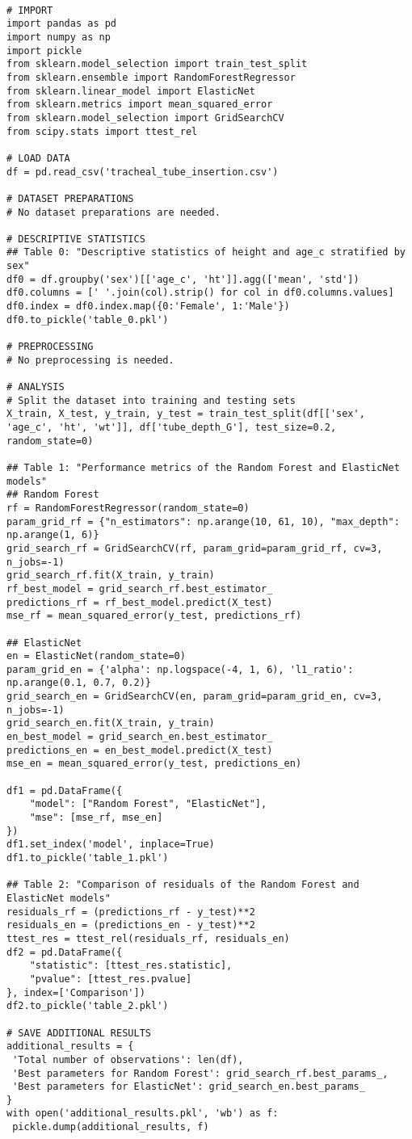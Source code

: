 \documentclass[11pt]{article}
\begin{document}
\begin{verbatim}

# IMPORT
import pandas as pd
import numpy as np
import pickle
from sklearn.model_selection import train_test_split
from sklearn.ensemble import RandomForestRegressor
from sklearn.linear_model import ElasticNet
from sklearn.metrics import mean_squared_error
from sklearn.model_selection import GridSearchCV
from scipy.stats import ttest_rel

# LOAD DATA
df = pd.read_csv('tracheal_tube_insertion.csv')

# DATASET PREPARATIONS
# No dataset preparations are needed.

# DESCRIPTIVE STATISTICS
## Table 0: "Descriptive statistics of height and age_c stratified by sex"
df0 = df.groupby('sex')[['age_c', 'ht']].agg(['mean', 'std'])
df0.columns = [' '.join(col).strip() for col in df0.columns.values]
df0.index = df0.index.map({0:'Female', 1:'Male'})
df0.to_pickle('table_0.pkl')

# PREPROCESSING
# No preprocessing is needed.

# ANALYSIS
# Split the dataset into training and testing sets
X_train, X_test, y_train, y_test = train_test_split(df[['sex', 'age_c', 'ht', 'wt']], df['tube_depth_G'], test_size=0.2, random_state=0)

## Table 1: "Performance metrics of the Random Forest and ElasticNet models"
## Random Forest
rf = RandomForestRegressor(random_state=0)
param_grid_rf = {"n_estimators": np.arange(10, 61, 10), "max_depth": np.arange(1, 6)}
grid_search_rf = GridSearchCV(rf, param_grid=param_grid_rf, cv=3, n_jobs=-1)
grid_search_rf.fit(X_train, y_train)
rf_best_model = grid_search_rf.best_estimator_
predictions_rf = rf_best_model.predict(X_test)
mse_rf = mean_squared_error(y_test, predictions_rf)

## ElasticNet
en = ElasticNet(random_state=0)
param_grid_en = {'alpha': np.logspace(-4, 1, 6), 'l1_ratio': np.arange(0.1, 0.7, 0.2)}
grid_search_en = GridSearchCV(en, param_grid=param_grid_en, cv=3, n_jobs=-1)
grid_search_en.fit(X_train, y_train)
en_best_model = grid_search_en.best_estimator_
predictions_en = en_best_model.predict(X_test)
mse_en = mean_squared_error(y_test, predictions_en)

df1 = pd.DataFrame({
    "model": ["Random Forest", "ElasticNet"],
    "mse": [mse_rf, mse_en]
})
df1.set_index('model', inplace=True)
df1.to_pickle('table_1.pkl')

## Table 2: "Comparison of residuals of the Random Forest and ElasticNet models"
residuals_rf = (predictions_rf - y_test)**2
residuals_en = (predictions_en - y_test)**2
ttest_res = ttest_rel(residuals_rf, residuals_en)
df2 = pd.DataFrame({
    "statistic": [ttest_res.statistic],
    "pvalue": [ttest_res.pvalue]
}, index=['Comparison'])
df2.to_pickle('table_2.pkl')

# SAVE ADDITIONAL RESULTS
additional_results = {
 'Total number of observations': len(df), 
 'Best parameters for Random Forest': grid_search_rf.best_params_,
 'Best parameters for ElasticNet': grid_search_en.best_params_
}
with open('additional_results.pkl', 'wb') as f:
 pickle.dump(additional_results, f)
 
\end{verbatim}
\end{document}
